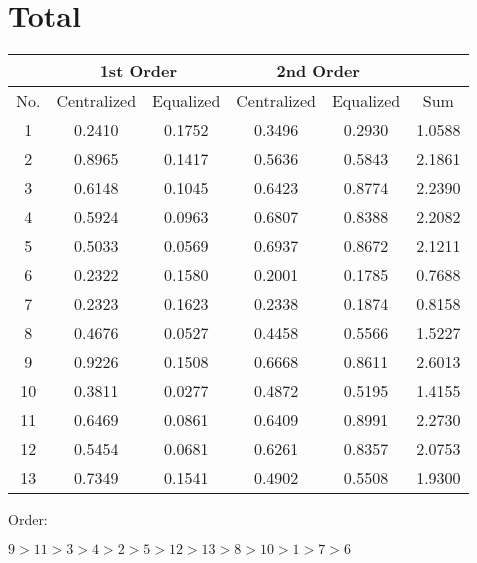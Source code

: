\documentclass[10pt,a4paper]{article}
\begin{document}
	\section*{Total}
	
		\begin{table}[!h]
			\centering
			\begin{tabular}{|c|c|c|c|c|c|}
				\hline
				& \multicolumn{2}{c|}{1st Order} & \multicolumn{2}{c|}{2nd Order}&\\
				\hline
				No. & Centralized & Equalized & Centralized & Equalized & Sum\\
				\hline
				1 & 0.2410 & 0.1752 & 0.3496 & 0.2930 & 1.0588\\
				\hline
				2 & 0.8965 & 0.1417 & 0.5636 & 0.5843 & 2.1861\\
				\hline
				3 & 0.6148 & 0.1045 & 0.6423 & 0.8774 & 2.2390\\
				\hline
				4 & 0.5924 & 0.0963 & 0.6807 & 0.8388 & 2.2082\\
				\hline
				5 & 0.5033 & 0.0569 & 0.6937 & 0.8672 & 2.1211\\
				\hline
				6 & 0.2322 & 0.1580 & 0.2001 & 0.1785 & 0.7688\\
				\hline
				7 & 0.2323 & 0.1623 & 0.2338 & 0.1874 & 0.8158\\
				\hline
				8 & 0.4676 & 0.0527 & 0.4458 & 0.5566 & 1.5227\\
				\hline
				9 & 0.9226 & 0.1508 & 0.6668 & 0.8611 & 2.6013\\
				\hline
				10 & 0.3811 & 0.0277 & 0.4872 & 0.5195 & 1.4155\\
				\hline
				11 & 0.6469 & 0.0861 & 0.6409 & 0.8991 & 2.2730\\
				\hline
				12 & 0.5454 & 0.0681 & 0.6261 & 0.8357 & 2.0753\\
				\hline
				13 & 0.7349 & 0.1541 & 0.4902 & 0.5508 & 1.9300\\
				\hline
			\end{tabular}
		\end{table}
		Order:
		
		$9 > 11 > 3 > 4 > 2 > 5 > 12 > 13 > 8 > 10 > 1 > 7 > 6$
		
\end{document}
